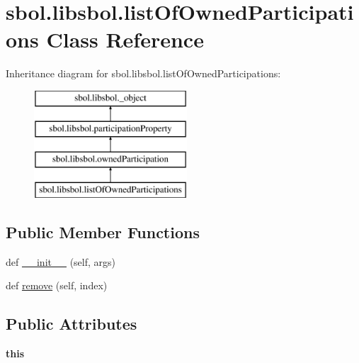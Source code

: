 \hypertarget{classsbol_1_1libsbol_1_1list_of_owned_participations}{}\section{sbol.\+libsbol.\+list\+Of\+Owned\+Participations Class Reference}
\label{classsbol_1_1libsbol_1_1list_of_owned_participations}
Inheritance diagram for sbol.\+libsbol.\+list\+Of\+Owned\+Participations\+:\begin{figure}[H]
\begin{center}
\leavevmode
\includegraphics[height=4.000000cm]{classsbol_1_1libsbol_1_1list_of_owned_participations}
\end{center}
\end{figure}
\subsection*{Public Member Functions}
\begin{DoxyCompactItemize}
\item 
def \hyperlink{classsbol_1_1libsbol_1_1list_of_owned_participations_aaacb6cc16c8db7d85a63b1011a001e02}{\+\_\+\+\_\+init\+\_\+\+\_\+} (self, args)
\item 
def \hyperlink{classsbol_1_1libsbol_1_1list_of_owned_participations_af3aae80b15c2e4898338244cee57c75e}{remove} (self, index)
\end{DoxyCompactItemize}
\subsection*{Public Attributes}
\begin{DoxyCompactItemize}
\item 
{\bfseries this}\hypertarget{classsbol_1_1libsbol_1_1list_of_owned_participations_a00376d54c8b5d0de889a4d3d4c336427}{}\label{classsbol_1_1libsbol_1_1list_of_owned_participations_a00376d54c8b5d0de889a4d3d4c336427}

\end{DoxyCompactItemize}
